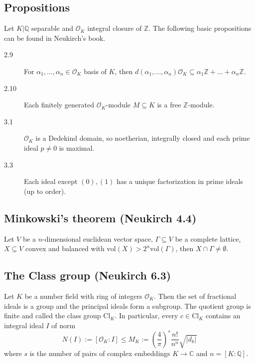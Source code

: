 \documentclass{scrartcl}
\newcommand{\Z}{\mathbb{Z}}
\newcommand{\Q}{\mathbb{Q}}
\begin{document}
\subsection{Propositions}
Let $K|\Q$ separable and $\mathcal{O}_K$ integral closure of $\Z$. The following basic propositions can be found in Neukirch's book.
\begin{description}
    \item[2.9] For $\alpha_1, ..., \alpha_n \in \mathcal{O}_K$ basis of $K$, then $d(\alpha_1, ..., \alpha_n)\mathcal{O}_K \subseteq \alpha_1 \Z + ... + \alpha_n \Z$.
    \item[2.10] Each finitely generated $\mathcal{O}_K$-module $M \subseteq K$ is a free $\Z$-module. 
    \item[3.1] $\mathcal{O}_K$ is a Dedekind domain, so noetherian, integrally closed and each prime ideal $p \neq 0$ is maximal.
    \item[3.3] Each ideal except $(0), (1)$ has a unique factorization in prime ideals (up to order). 
\end{description}

\subsection{Minkowski's theorem (Neukirch 4.4)}
Let $V$ be a $n$-dimensional euclidean vector space, $\Gamma \subseteq V$ be a complete lattice, $X \subseteq V$ convex and balanced with $\mathrm{vol}(X) > 2^n \mathrm{vol}(\Gamma)$, then $X \cap \Gamma \neq \emptyset$.

\subsection{The Class group (Neukirch 6.3)}
Let $K$ be a number field with ring of integers $\mathcal{O}_K$. Then the set of fractional ideals is a group and the principal ideals form a subgroup. The quotient group is finite and called the class group $\mathrm{Cl}_K$. In particular, every $c \in \mathrm{Cl}_K$ contains an integral ideal $I$ of norm
\begin{equation*}
    N(I) := [ \mathcal{O}_K : I ] \leq M_K := \left( \frac 4 \pi \right)^s \frac {n!} {n^n} \sqrt{|d_k|}
\end{equation*}
where $s$ is the number of pairs of complex embeddings $K \to \mathbb{C}$ and $n = [K : \Q]$.
\end{document}
